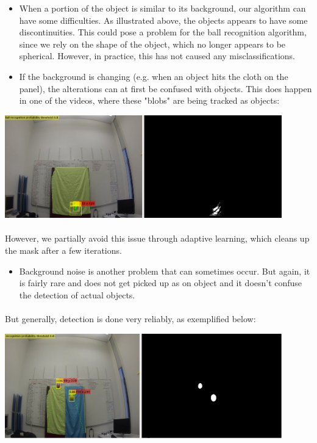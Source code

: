 \documentclass[10pt,a4paper]{article}
\begin{document}
\begin{itemize}
\item  When a portion of the object is similar to its background, our algorithm can have some difficulties. As illustrated above, the objects appears to have some discontinuities. This could pose a problem for the ball recognition algorithm, since we rely on the shape of the object, which no longer appears to be spherical. However, in practice, this has not caused any misclassifications.

\item If the background is changing (e.g. when an object hits the cloth on the panel), the alterations can at first be confused with objects. This does happen in one of the videos, where these "blobs" are being tracked as objects:
\end{itemize}

\begin{center}
\includegraphics[width=12cm]{background_change1.png}
\end{center}
  
\paragraph{} However, we partially avoid this issue through adaptive learning, which cleans up the mask after a few iterations.

\begin{itemize}
\item Background noise is another problem that can sometimes occur. But again, it is fairly rare and does not get picked up as on object and it doesn't confuse the detection of actual objects.
\end{itemize}

\paragraph{} But generally, detection is done very reliably, as exemplified below: 
\begin{center}
	\includegraphics[width=12cm]{multi_ball_detection.png}	
\end{center}
\end{document}
